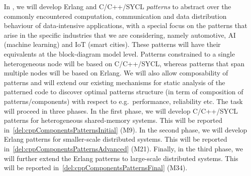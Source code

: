 \begin{Workpackage}{\thewpno}
\begin{Task}
\TaskResults{
\ref{del:cppComponentsPatternsInitial}
\ref{del:cppComponentsPatternsAdvanced}
\ref{del:cppComponentsPatternsFinal}
}
\TaskHeader{}
In \theTask, we will develop Erlang and C/C++/SYCL \emph{patterns} to abstract over the commonly encountered
computation, communication and data distribution behaviour of data-intensive applications, with a
special focus on the patterns that arise in the specific industries that we are considering, namely
automotive, AI (machine learning) and IoT (smart cities). These patterns will have their equivalents at the
block-diagram model level. Patterns constrained to a single heterogeneous node will be based on C/C++/SYCL, whereas patterns that span multiple nodes will be based on Erlang. We will also allow composability of patterns and will extend our existing mechanisms
for static analysis of the patterned code to discover optimal patterns structure (in term of composition of 
patterns/components) with respect to e.g.~performance, reliability etc. 
The task will proceed in three phases. In the first phase, we will develop C/C++/SYCL patterns for heterogeneous
shared-memory systems. This will be reported in~\ref{del:cppComponentsPatternsInitial} (M9). In the second phase, we will develop Erlang patterns
for smaller-scale distributed systems. This will be reported in~\ref{del:cppComponentsPatternsAdvanced} (M21). Finally, in the third phase, we will
further extend the Erlang patterns to large-scale distributed systems. This will be reported in~\ref{del:cppComponentsPatternsFinal} (M34).
\end{Task}


\end{Workpackage}
